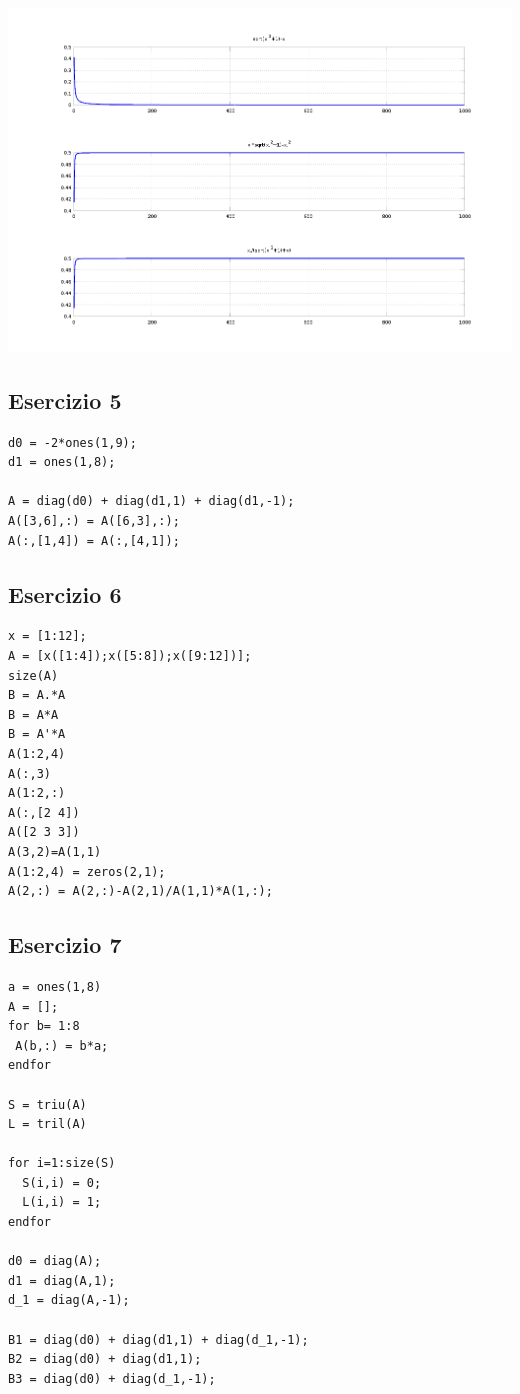 \documentclass{article}
\begin{document}
\centerline{\includegraphics[scale=0.6]{ex24.png}}


\newpage
\subsection{ Esercizio 5}
\begin{lstlisting}
d0 = -2*ones(1,9);
d1 = ones(1,8);

A = diag(d0) + diag(d1,1) + diag(d1,-1);
A([3,6],:) = A([6,3],:);
A(:,[1,4]) = A(:,[4,1]);
\end{lstlisting}


\newpage
\subsection{ Esercizio 6}
\begin{lstlisting}
x = [1:12];
A = [x([1:4]);x([5:8]);x([9:12])];
size(A)
B = A.*A
B = A*A
B = A'*A
A(1:2,4)
A(:,3)
A(1:2,:)
A(:,[2 4])
A([2 3 3])
A(3,2)=A(1,1)
A(1:2,4) = zeros(2,1);
A(2,:) = A(2,:)-A(2,1)/A(1,1)*A(1,:);
\end{lstlisting}


\newpage
\subsection{ Esercizio 7}
\begin{lstlisting}
a = ones(1,8)
A = [];
for b= 1:8
 A(b,:) = b*a;
endfor

S = triu(A)
L = tril(A)

for i=1:size(S)
  S(i,i) = 0;
  L(i,i) = 1;
endfor

d0 = diag(A);
d1 = diag(A,1);
d_1 = diag(A,-1);

B1 = diag(d0) + diag(d1,1) + diag(d_1,-1);
B2 = diag(d0) + diag(d1,1);
B3 = diag(d0) + diag(d_1,-1);


\end{lstlisting}
\end{document}
